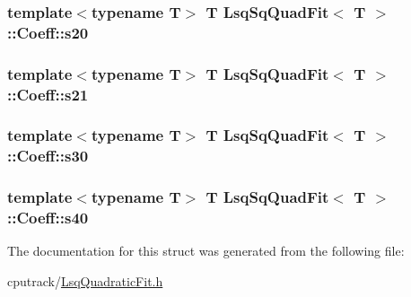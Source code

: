 \subsubsection[{\texorpdfstring{s20}{s20}}]{\setlength{\rightskip}{0pt plus 5cm}template$<$typename T$>$ T {\bf Lsq\+Sq\+Quad\+Fit}$<$ T $>$\+::Coeff\+::s20}\hypertarget{struct_lsq_sq_quad_fit_1_1_coeff_a837251d5f164597eb5ff2759df1d8882}{}\label{struct_lsq_sq_quad_fit_1_1_coeff_a837251d5f164597eb5ff2759df1d8882}
\subsubsection[{\texorpdfstring{s21}{s21}}]{\setlength{\rightskip}{0pt plus 5cm}template$<$typename T$>$ T {\bf Lsq\+Sq\+Quad\+Fit}$<$ T $>$\+::Coeff\+::s21}\hypertarget{struct_lsq_sq_quad_fit_1_1_coeff_a91d41e9b15e90da177f5c5f245508723}{}\label{struct_lsq_sq_quad_fit_1_1_coeff_a91d41e9b15e90da177f5c5f245508723}
\subsubsection[{\texorpdfstring{s30}{s30}}]{\setlength{\rightskip}{0pt plus 5cm}template$<$typename T$>$ T {\bf Lsq\+Sq\+Quad\+Fit}$<$ T $>$\+::Coeff\+::s30}\hypertarget{struct_lsq_sq_quad_fit_1_1_coeff_ac756c374b5be8c857aab50c63b025307}{}\label{struct_lsq_sq_quad_fit_1_1_coeff_ac756c374b5be8c857aab50c63b025307}
\subsubsection[{\texorpdfstring{s40}{s40}}]{\setlength{\rightskip}{0pt plus 5cm}template$<$typename T$>$ T {\bf Lsq\+Sq\+Quad\+Fit}$<$ T $>$\+::Coeff\+::s40}\hypertarget{struct_lsq_sq_quad_fit_1_1_coeff_ae352321176113dcbe22edfb94cb0974a}{}\label{struct_lsq_sq_quad_fit_1_1_coeff_ae352321176113dcbe22edfb94cb0974a}


The documentation for this struct was generated from the following file\+:\begin{DoxyCompactItemize}
\item 
cputrack/\hyperlink{_lsq_quadratic_fit_8h}{Lsq\+Quadratic\+Fit.\+h}\end{DoxyCompactItemize}
